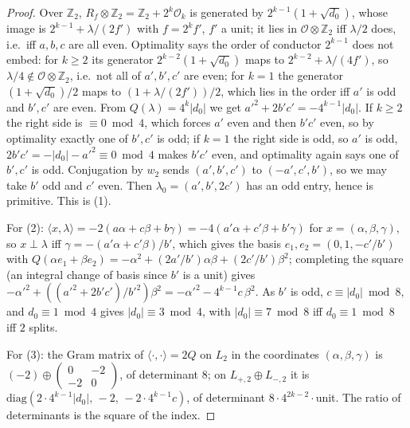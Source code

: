 \documentclass[11pt,reqno]{amsart}
\theoremstyle{plain}
\theoremstyle{definition}
\newcommand{\Z}{\mathbb{Z}}
\begin{document}
\begin{proof}
Over $\Z_2$, $R_f\otimes\Z_2=\Z_2+2^k\mathcal O_{k}$ is generated by $2^{k-1}(1+\sqrt{d_0})$, whose
image is $2^{k-1}+\lambda/(2f')$ with $f=2^kf'$, $f'$ a unit; it lies in $\mathcal O\otimes\Z_2$ iff
$\lambda/2$ does, i.e.\ iff $a,b,c$ are all even. Optimality says the order of conductor $2^{k-1}$
does not embed: for $k\ge2$ its generator $2^{k-2}(1+\sqrt{d_0})$ maps to $2^{k-2}+\lambda/(4f')$, so
$\lambda/4\notin\mathcal O\otimes\Z_2$, i.e.\ not all of $a',b',c'$ are even; for $k=1$ the generator
$(1+\sqrt{d_0})/2$ maps to $(1+\lambda/(2f'))/2$, which lies in the order iff $a'$ is odd and $b',c'$
are even. From $Q(\lambda)=4^k\lvert d_0\rvert$ we get $a'^2+2b'c'=-4^{k-1}\lvert d_0\rvert$. If
$k\ge2$ the right side is $\equiv0\bmod4$, which forces $a'$ even and then $b'c'$ even, so by
optimality exactly one of $b',c'$ is odd; if $k=1$ the right side is odd, so $a'$ is odd,
$2b'c'=-\lvert d_0\rvert-a'^2\equiv0\bmod4$ makes $b'c'$ even, and optimality again says one of
$b',c'$ is odd. Conjugation by $w_2$ sends $(a',b',c')$ to $(-a',c',b')$, so we may take $b'$ odd and
$c'$ even. Then $\lambda_0=(a',b',2c')$ has an odd entry, hence is primitive. This is (1).

For (2): $\langle x,\lambda\rangle=-2(a\alpha+c\beta+b\gamma)=-4(a'\alpha+c'\beta+b'\gamma)$ for
$x=(\alpha,\beta,\gamma)$, so $x\perp\lambda$ iff $\gamma=-(a'\alpha+c'\beta)/b'$, which gives the
basis $e_1,e_2=(0,1,-c'/b')$ with $Q(\alpha e_1+\beta e_2)=-\alpha^2+(2a'/b')\alpha\beta+(2c'/b')
\beta^2$; completing the square (an integral change of basis since $b'$ is a unit) gives $-\alpha'^2
+((a'^2+2b'c')/b'^2)\beta^2=-\alpha'^2-4^{k-1}c\,\beta^2$. As $b'$ is odd, $c\equiv\lvert d_0\rvert
\bmod8$, and $d_0\equiv1\bmod4$ gives $\lvert d_0\rvert\equiv3\bmod4$, with $\lvert d_0\rvert\equiv7
\bmod8$ iff $d_0\equiv1\bmod8$ iff $2$ splits.

For (3): the Gram matrix of $\langle\cdot,\cdot\rangle=2Q$ on $L_2$ in the coordinates $(\alpha,
\beta,\gamma)$ is $(-2)\oplus\begin{pmatrix}0&-2\\-2&0\end{pmatrix}$, of determinant $8$; on
$L_{+,2}\oplus L_{-,2}$ it is $\mathrm{diag}(2\cdot4^{k-1}\lvert d_0\rvert,\,-2,\,-2\cdot4^{k-1}c)$,
of determinant $8\cdot4^{2k-2}\cdot$unit. The ratio of determinants is the square of the index.


\end{proof}
\end{document}

